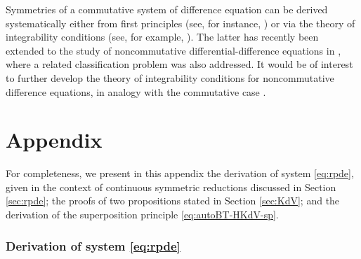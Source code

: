 \documentclass[dvips,10pt]{article}
\theoremstyle{remark} %
\begin{document}
	Symmetries of a commutative system of difference equation can be derived systematically either from first principles (see, for instance, \cite{FX,TTX2}) or via the theory of integrability conditions (see, for example, \cite{BX,LY,MWX,MX,X}). The latter has recently been extended to the study of noncommutative differential-difference equations in \cite{NW}, where a related classification problem was also addressed. It would be of interest to further develop the theory of integrability conditions for noncommutative difference equations, in analogy with the commutative case \cite{MWX,MX}.
	
	
	
	\section*{Appendix}
	
For completeness, we present in this appendix the derivation of system \eqref{eq:rpde}, given in the context of continuous symmetric reductions discussed in Section \ref{sec:rpde}; the proofs of two propositions stated in Section \ref{sec:KdV}; and the derivation of the superposition principle \eqref{eq:autoBT-HKdV-sp}.
	
	\subsubsection*{Derivation of system \eqref{eq:rpde}}
	
\end{document}
